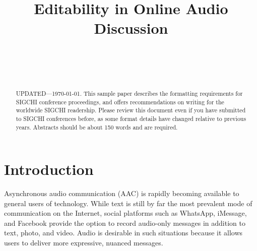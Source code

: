 \documentclass{sigchi}
\begin{document}
\title{Editability in Online Audio Discussion}

\author{%
  \\
  \\
  \\
}

\maketitle

\begin{abstract}
  UPDATED---\today. This sample paper describes the
  formatting requirements for SIGCHI conference proceedings, and
  offers recommendations on writing for the worldwide SIGCHI
  readership. Please review this document even if you have submitted
  to SIGCHI conferences before, as some format details have changed
  relative to previous years. Abstracts should be about 150 words and
  are required.
\end{abstract}


 

\section{Introduction}

Asynchronous audio communication (AAC) is rapidly becoming available to general users of technology. 
While text is still by far the most prevalent mode of communication on the Internet, social platforms such as WhatsApp, iMessage, and Facebook provide the option to record audio-only messages in addition to text, photo, and video. 
Audio is desirable in such situations because it allows users to deliver more expressive, nuanced messages.
\end{document}
